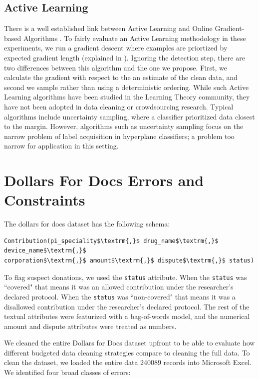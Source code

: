 \subsection{Active Learning}\label{al}
There is a well established link between Active Learning and Online Gradient-based Algorithms \cite{guillory2009active}. 
To fairly evaluate an Active Learning methodology in these experiments, we run a gradient descent where examples are priortized by expected gradient length (explained in \cite{settles2010active}).
Ignoring the detection step, there are two differences between this algorithm and the one we propose.
First, we calculate the gradient with respect to the an estimate of the clean data, and second we sample rather than using a deterministic ordering.
While such Active Learning algorithms have been studied in the Learning Theory community, they have not been adopted in data cleaning or crowdsourcing research.
Typical algorithms include uncertainty sampling, where a classifier prioritized data closest to the margin.
However, algorithms such as uncertainty sampling focus on the narrow problem of label acquisition in hyperplane classifiers; a problem too narrow for application in this setting.

\section{Dollars For Docs Errors and Constraints}\label{dfd-errors}
The dollars for docs dataset has the following schema:
\begin{lstlisting}[mathescape,basicstyle={\scriptsize}]
Contribution(pi_speciality$\textrm{,}$ drug_name$\textrm{,}$ device_name$\textrm{,}$
corporation$\textrm{,}$ amount$\textrm{,}$ dispute$\textrm{,}$ status)
\end{lstlisting}
To flag suspect donations, we used the \texttt{status} attribute.
When the \texttt{status} was ``covered" that means it was an allowed contribution under the researcher's declared protocol.
When the \texttt{status} was ``non-covered" that means it was a disallowed contribution under the researcher's declared protocol.
The rest of the textual attributes were featurized with a bag-of-words model, and the numerical amount and dispute attributes were treated as numbers.

We cleaned the entire Dollars for Docs dataset upfront to be able to evaluate how different budgeted data cleaning strategies compare to cleaning the full data.
To clean the dataset, we loaded the entire data 240089 records into Microsoft Excel. We identified four broad classes of errors:
\vspace{0.25em}

